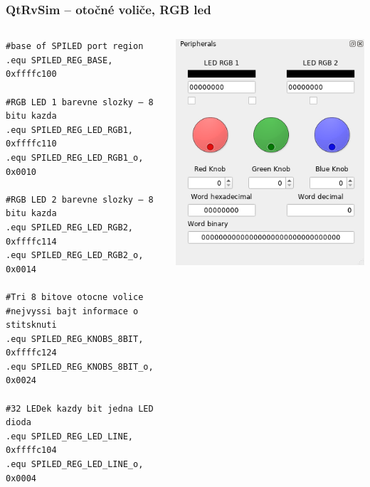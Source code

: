 \documentclass{beamer}
\begin{document}
\begin{frame}[fragile]
\frametitle{QtRvSim -- otočné voliče, RGB led}

\begin{columns}
\begin{column}{0.6\textwidth}  
\begin{verbatim}
#base of SPILED port region
.equ SPILED_REG_BASE,       0xffffc100

#RGB LED 1 barevne slozky – 8 bitu kazda
.equ SPILED_REG_LED_RGB1,   0xffffc110
.equ SPILED_REG_LED_RGB1_o,   0x0010

#RGB LED 2 barevne slozky – 8 bitu kazda
.equ SPILED_REG_LED_RGB2,   0xffffc114
.equ SPILED_REG_LED_RGB2_o,   0x0014

#Tri 8 bitove otocne volice
#nejvyssi bajt informace o stitsknuti
.equ SPILED_REG_KNOBS_8BIT, 0xffffc124 
.equ SPILED_REG_KNOBS_8BIT_o, 0x0024

#32 LEDek kazdy bit jedna LED dioda
.equ SPILED_REG_LED_LINE,   0xffffc104
.equ SPILED_REG_LED_LINE_o,   0x0004
\end{verbatim}
\end{column}
\begin{column}{0.4\textwidth}
\includegraphics[width=\textwidth]{fig/knobs.png}
\end{column}
\end{columns}

\end{frame}
\end{document}
